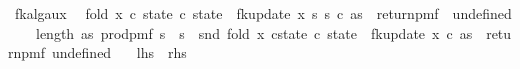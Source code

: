 \begin{isabellebody}
\begin{isamarkuptext}
\end{isamarkuptext}\isamarkuptrue%
\isamarkupfalse%
\ fk{\isacharunderscore}{\kern0pt}alg{\isacharunderscore}{\kern0pt}aux{\isacharunderscore}{\kern0pt}{}{\isacharcolon}{\kern0pt}\isanewline
\ \ {\isachardoublequoteopen}fold\ {\isacharparenleft}{\kern0pt}{\isasymlambda}x\ {\isacharparenleft}{\kern0pt}c{\isacharcomma}{\kern0pt}\ state{\isacharparenright}{\kern0pt}{\isachardot}{\kern0pt}\ {\isacharparenleft}{\kern0pt}c{\isacharplus}{\kern0pt}{}{\isacharcomma}{\kern0pt}\ state\ {\isasymbind}\ fk{\isacharunderscore}{\kern0pt}update{\isacharprime}{\kern0pt}\ x\ s\ s\ c{\isacharparenright}{\kern0pt}{\isacharparenright}{\kern0pt}\ as\ {\isacharparenleft}{\kern0pt}{}{\isacharcomma}{\kern0pt}\ return{\isacharunderscore}{\kern0pt}pmf\ {\isacharparenleft}{\kern0pt}{\isasymlambda}{\isacharunderscore}{\kern0pt}{\isachardot}{\kern0pt}\ undefined{\isacharparenright}{\kern0pt}{\isacharparenright}{\kern0pt}\isanewline
\ \ {\isacharequal}{\kern0pt}\ \ {\isacharparenleft}{\kern0pt}length\ as{\isacharcomma}{\kern0pt}\ prod{\isacharunderscore}{\kern0pt}pmf\ {\isacharparenleft}{\kern0pt}{\isacharbraceleft}{\kern0pt}{}{\isachardot}{\kern0pt}{\isachardot}{\kern0pt}{\isacharless}{\kern0pt}s\ {\isasymtimes}\ {\isacharbraceleft}{\kern0pt}{}{\isachardot}{\kern0pt}{\isachardot}{\kern0pt}{\isacharless}{\kern0pt}s\ {\isacharparenleft}{\kern0pt}{\isasymlambda}{\isacharunderscore}{\kern0pt}{\isachardot}{\kern0pt}\ {\isacharparenleft}{\kern0pt}snd\ {\isacharparenleft}{\kern0pt}fold\ {\isacharparenleft}{\kern0pt}{\isasymlambda}x\ {\isacharparenleft}{\kern0pt}c{\isacharcomma}{\kern0pt}state{\isacharparenright}{\kern0pt}{\isachardot}{\kern0pt}\ {\isacharparenleft}{\kern0pt}c{\isacharplus}{\kern0pt}{}{\isacharcomma}{\kern0pt}\ state\ {\isasymbind}\ fk{\isacharunderscore}{\kern0pt}update{\isacharprime}{\kern0pt}{\isacharprime}{\kern0pt}\ x\ c{\isacharparenright}{\kern0pt}{\isacharparenright}{\kern0pt}\ as\ {\isacharparenleft}{\kern0pt}{}{\isacharcomma}{\kern0pt}\ return{\isacharunderscore}{\kern0pt}pmf\ undefined{\isacharparenright}{\kern0pt}{\isacharparenright}{\kern0pt}{\isacharparenright}{\kern0pt}{\isacharparenright}{\kern0pt}{\isacharparenright}{\kern0pt}{\isachardoublequoteclose}\isanewline
\ \ {\isacharparenleft}{\kern0pt}\ {\isachardoublequoteopen}{\isacharquery}{\kern0pt}lhs\ {\isacharequal}{\kern0pt}\ {\isacharquery}{\kern0pt}rhs{\isachardoublequoteclose}{\isacharparenright}{\kern0pt}\isanewline

\end{isabellebody}
